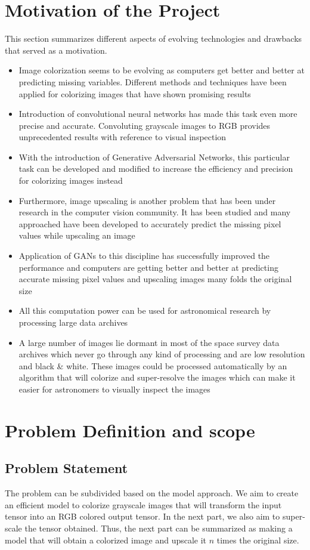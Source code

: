 \documentclass[oneside,a4paper,12pt]{report}
\begin{document}
\section{Motivation of the Project}
\hspace*{0.25 in}This section summarizes different aspects of evolving technologies and drawbacks that served as a motivation.
\begin{itemize}
\item Image colorization seems to be evolving as computers get better and better at predicting missing variables. Different methods and techniques have been applied for colorizing images that have shown promising results
\item Introduction of convolutional neural networks has made this task even more precise and accurate. Convoluting grayscale images to RGB provides unprecedented results with reference to visual inspection
\item With the introduction of Generative Adversarial Networks, this particular task can be developed and modified to increase the efficiency and precision for colorizing images instead
\item Furthermore, image upscaling is another problem that has been under research in the computer vision community. It has been studied and many approached have been developed to accurately predict the missing pixel values while upscaling an image
\item Application of GANs to this discipline has successfully improved the performance and computers are getting better and better at predicting accurate missing pixel values and upscaling images many folds the original size
\item All this computation power can be used for astronomical research by processing large data archives
\item A large number of images lie dormant in most of the space survey data archives which never go through any kind of processing and are low resolution and black \& white. These images could be processed automatically by an algorithm that will colorize and super-resolve the images which can make it easier for astronomers to visually inspect the images
\end{itemize}

\section{Problem Definition and scope}
\subsection{Problem Statement}
\hspace*{0.25 in}The problem can be subdivided based on the model approach. We aim to create an efficient model to colorize grayscale images that will transform the input tensor into an RGB colored output tensor. In the next part, we also aim to super-scale the tensor obtained. Thus, the next part can be summarized as making a model that will obtain a colorized image and upscale it $n$ times the original size.
\end{document}

